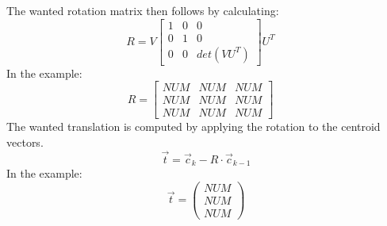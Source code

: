 The wanted rotation matrix then follows by calculating:
\begin{equation*}
    R=V
    \begin{bmatrix}
        1 & 0 & 0 \\
        0 & 1 & 0 \\
        0 & 0 & det(VU^{T})
    \end{bmatrix}U^{T} \quad
\end{equation*}
In the example:
\begin{equation*}
    R=
    \begin{bmatrix}
        NUM & NUM & NUM \\
        NUM & NUM & NUM \\
        NUM & NUM & NUM
    \end{bmatrix} \quad
\end{equation*}
The wanted translation is computed by applying the rotation to the centroid vectors. 
\begin{equation*}
    \vec{t} = \vec{c}_{k}-R\cdot\vec{c}_{k-1}
\end{equation*}
In the example:
\begin{equation*}
    \vec{t} = 
    \begin{pmatrix}
        NUM \\
        NUM \\
        NUM
    \end{pmatrix}
\end{equation*}


